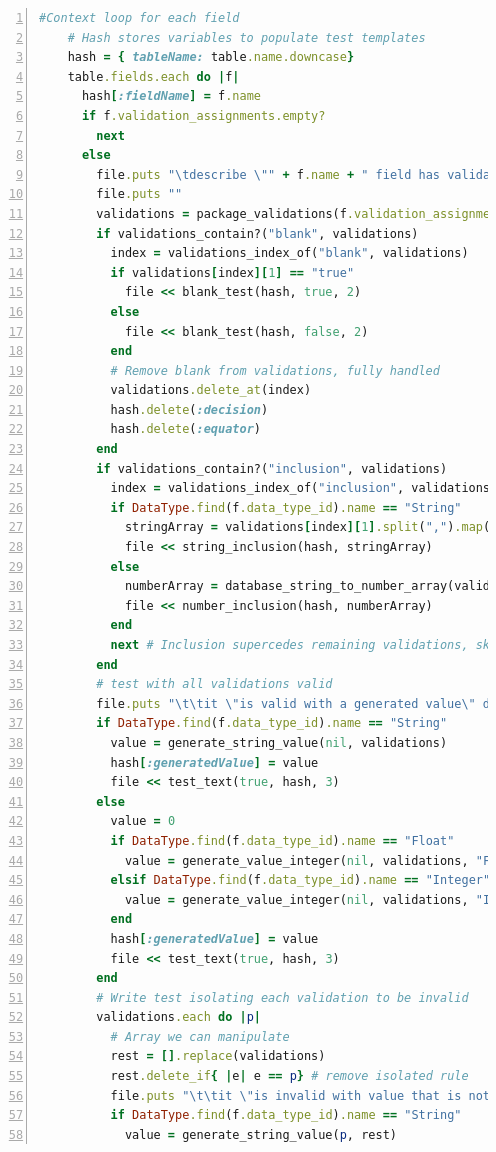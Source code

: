 \documentclass[a4paper,12pt]{article}
\begin{document}
\begin{lstlisting}[frame=single,numbers=left,language = ruby,caption= {generate\_tests\_for\_table}, label={code:bigboy}]
    #Context loop for each field
    # Hash stores variables to populate test templates
    hash = { tableName: table.name.downcase}
    table.fields.each do |f|
      hash[:fieldName] = f.name
      if f.validation_assignments.empty?
        next 
      else
        file.puts "\tdescribe \"" + f.name + " field has validation\" do"
        file.puts ""
        validations = package_validations(f.validation_assignments)
        if validations_contain?("blank", validations)
          index = validations_index_of("blank", validations)
          if validations[index][1] == "true"
            file << blank_test(hash, true, 2)
          else
            file << blank_test(hash, false, 2)
          end
          # Remove blank from validations, fully handled
          validations.delete_at(index)
          hash.delete(:decision)
          hash.delete(:equator)
        end
        if validations_contain?("inclusion", validations)
          index = validations_index_of("inclusion", validations)
          if DataType.find(f.data_type_id).name == "String"
            stringArray = validations[index][1].split(",").map(&:strip)
            file << string_inclusion(hash, stringArray)
          else
            numberArray = database_string_to_number_array(validations[index][1])
            file << number_inclusion(hash, numberArray)
          end
          next # Inclusion supercedes remaining validations, skip to next
        end
        # test with all validations valid
        file.puts "\t\tit \"is valid with a generated value\" do\n"
        if DataType.find(f.data_type_id).name == "String"          
          value = generate_string_value(nil, validations)
          hash[:generatedValue] = value
          file << test_text(true, hash, 3)
        else
          value = 0
          if DataType.find(f.data_type_id).name == "Float"
            value = generate_value_integer(nil, validations, "Float")
          elsif DataType.find(f.data_type_id).name == "Integer"
            value = generate_value_integer(nil, validations, "Integer")
          end
          hash[:generatedValue] = value
          file << test_text(true, hash, 3)
        end
        # Write test isolating each validation to be invalid
        validations.each do |p|
          # Array we can manipulate
          rest = [].replace(validations)
          rest.delete_if{ |e| e == p} # remove isolated rule
          file.puts "\t\tit \"is invalid with value that is not " + p[0].to_s + " " + p[1].to_s + "\" do"
          if DataType.find(f.data_type_id).name == "String"
            value = generate_string_value(p, rest)

\end{lstlisting}
\end{document}
